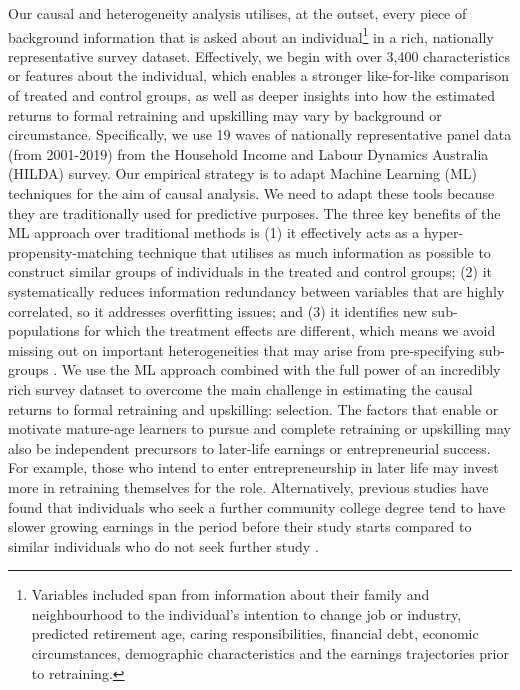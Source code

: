 \documentclass[12pt, a4paper]{article}
\begin{document}
Our causal and heterogeneity analysis utilises, at the outset, every piece of background information that is asked about an individual\footnote{Variables included span from information about their family and neighbourhood to the individual’s intention to change job or industry, predicted retirement age, caring responsibilities, financial debt, economic circumstances, demographic characteristics and the earnings trajectories prior to retraining.} in a rich, nationally representative survey dataset. Effectively, we begin with over 3,400 characteristics or features about the individual, which enables a stronger like-for-like comparison of treated and control groups, as well as deeper insights into how the estimated returns to formal retraining and upskilling may vary by background or circumstance. Specifically, we use 19 waves of nationally representative panel data (from 2001-2019) from the Household Income and Labour Dynamics Australia (HILDA) survey. Our empirical strategy is to adapt Machine Learning (ML) techniques for the aim of causal analysis. We need to adapt these tools because they are traditionally used for predictive purposes. The three key benefits of the ML approach over traditional methods is (1) it effectively acts as a hyper-propensity-matching technique that utilises as much information as possible to construct similar groups of individuals in the treated and control groups; (2) it systematically reduces information redundancy between variables that are highly correlated, so it addresses overfitting issues; and (3) it identifies new sub-populations for which the treatment effects are different, which means we avoid missing out on important heterogeneities that may arise from pre-specifying sub-groups \citep{athey2017, knaus2021}.
We use the ML approach combined with the full power of an incredibly rich survey dataset to overcome the main challenge in estimating the causal returns to formal retraining and upskilling: selection. The factors that enable or motivate mature-age learners to pursue and complete retraining or upskilling may also be independent precursors to later-life earnings or entrepreneurial success. For example, those who intend to enter entrepreneurship in later life may invest more in retraining themselves for the role. Alternatively, previous studies have found that individuals who seek a further community college degree tend to have slower growing earnings in the period before their study starts compared to similar individuals who do not seek further study \citep{jacobson2005, dynarski2016, dynarski2018}. 
\end{document}
